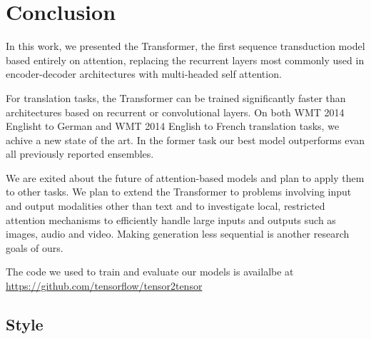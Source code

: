 \documentclass{article}
\begin{document}
\section{Conclusion}

In this work, we presented the Transformer, the first sequence transduction model based entirely on attention, replacing the recurrent layers most commonly used in encoder-decoder architectures with multi-headed self attention.

For translation tasks, the Transformer can be trained significantly faster than architectures based on recurrent or convolutional layers. 
On both WMT 2014 Englisht to German and WMT 2014 English to French translation tasks, we achive a new state of the art. In the former task our best model outperforms evan all previously reported ensembles.

We are exited about the future of attention-based models and plan to apply them to other tasks.
We plan to extend the Transformer to problems involving input and output modalities other than text and to investigate local, restricted attention mechanisms to efficiently handle large inputs and outputs such as images, audio and video.
Making generation less sequential is another research goals of ours.

The code we used to train and evaluate our models is availalbe at \url{https://github.com/tensorflow/tensor2tensor}

\subsection{Style}
\end{document}
